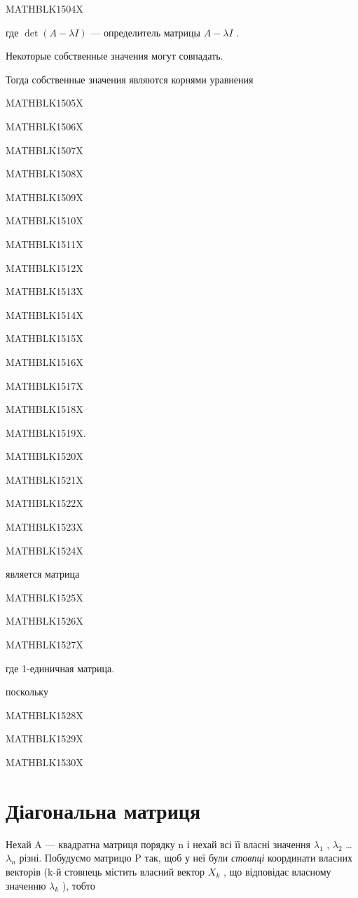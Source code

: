 \documentclass[
  ukrainian,
]{article}
\begin{document}
MATHBLK1504X

где \(\det(A-\lambda I)\) --- определитель матрицы \(A-\lambda I\) .

Некоторые собственные значения могут совпадать.

Тогда собственные значения являются корнями уравнения

MATHBLK1505X

MATHBLK1506X

MATHBLK1507X

MATHBLK1508X

MATHBLK1509X

MATHBLK1510X

MATHBLK1511X

MATHBLK1512X

MATHBLK1513X

MATHBLK1514X

MATHBLK1515X

MATHBLK1516X

MATHBLK1517X

MATHBLK1518X

MATHBLK1519X.

MATHBLK1520X

MATHBLK1521X

MATHBLK1522X

MATHBLK1523X

MATHBLK1524X

является матрица

MATHBLK1525X

MATHBLK1526X

MATHBLK1527X

где 1-единичная матрица.

поскольку

MATHBLK1528X

MATHBLK1529X

MATHBLK1530X

\section{Діагональна
матриця}\label{ux434ux456ux430ux433ux43eux43dux430ux43bux44cux43dux430-ux43cux430ux442ux440ux438ux446ux44f}

Нехай A --- квадратна матриця порядку n і нехай всі її власні значення
\(\lambda_1\) , \(\lambda_2\) \ldots{} \(\lambda_n\) різні. Побудуємо
матрицю P так, щоб у неї були \emph{стовпці} координати власних векторів
(k-й стовпець містить власний вектор \(X_k\) , що відповідає власному
значенню \(\lambda_k\) ), тобто
\end{document}
